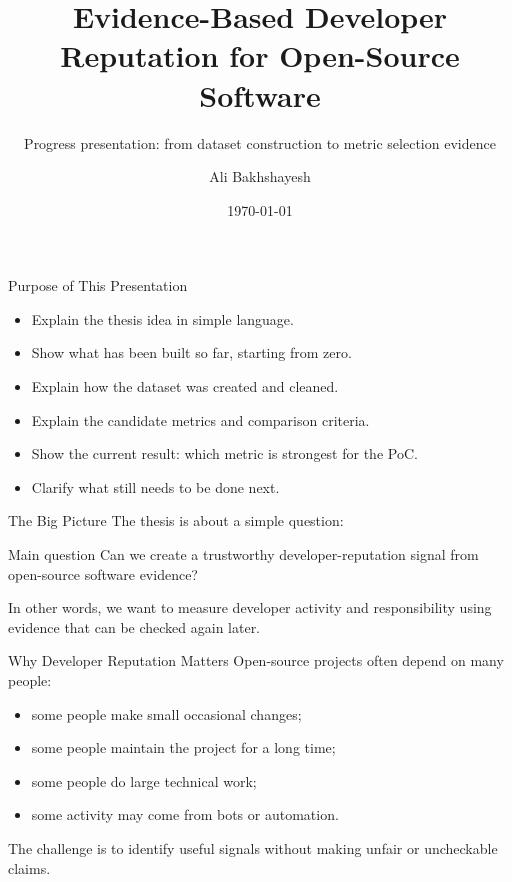 \documentclass[aspectratio=169,11pt]{beamer}
\title[Thesis Progress]{Evidence-Based Developer Reputation for Open-Source Software}
\subtitle{Progress presentation: from dataset construction to metric selection evidence}
\author{Ali Bakhshayesh}
\institute{University of Padova}
\date{\today}
\begin{document}
\begin{frame}
  \titlepage
\end{frame}

\begin{frame}{Purpose of This Presentation}
  \begin{itemize}
    \item Explain the thesis idea in simple language.
    \item Show what has been built so far, starting from zero.
    \item Explain how the dataset was created and cleaned.
    \item Explain the candidate metrics and comparison criteria.
    \item Show the current result: which metric is strongest for the PoC.
    \item Clarify what still needs to be done next.
  \end{itemize}
\end{frame}

\begin{frame}{The Big Picture}
  The thesis is about a simple question:

  \vspace{0.4cm}
  \begin{block}{Main question}
    Can we create a trustworthy developer-reputation signal from open-source software evidence?
  \end{block}

  \vspace{0.3cm}
  In other words, we want to measure developer activity and responsibility using evidence that can be checked again later.
\end{frame}

\begin{frame}{Why Developer Reputation Matters}
  Open-source projects often depend on many people:
  \begin{itemize}
    \item some people make small occasional changes;
    \item some people maintain the project for a long time;
    \item some people do large technical work;
    \item some activity may come from bots or automation.
  \end{itemize}

  \vspace{0.3cm}
  The challenge is to identify useful signals without making unfair or uncheckable claims.
\end{frame}
\end{document}
